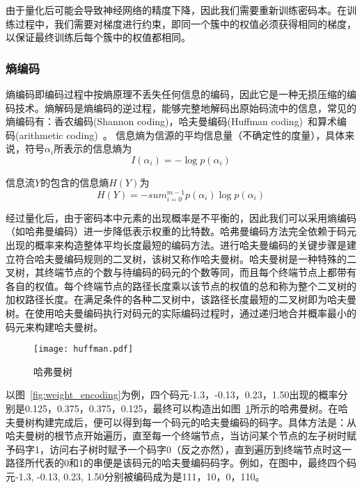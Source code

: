 由于量化后可能会导致神经网络的精度下降，因此我们需要重新训练密码本。在训练过程中，我们需要对梯度进行约束，即同一个簇中的权值必须获得相同的梯度，以保证最终训练后每个簇中的权值都相同。

\subsubsection{熵编码}


熵编码即编码过程中按熵原理不丢失任何信息的编码，因此它是一种无损压缩的编码技术。熵解码是熵编码的逆过程，能够完整地解码出原始码流中的信息，常见的熵编码有：香农编码(Shannon coding)，哈夫曼编码(Huffman coding)~\cite{huffman1952method}和算术编码(arithmetic coding)~\cite{witten1987arithmetic}。
信息熵为信源的平均信息量（不确定性的度量），具体来说，符号$\alpha_i$所表示的信息熵为
\begin{equation}
I(\alpha _i) = -\log p(\alpha _i)
\end{equation}

信息流$Y$的包含的信息熵$H(Y)$为
\begin{equation}
H(Y) = -sum_{i=0}^{m-1} p(\alpha _i) \log p(\alpha _i)
\end{equation}

经过量化后，由于密码本中元素的出现概率是不平衡的，因此我们可以采用熵编码（如哈弗曼编码）进一步降低表示权重的比特数。哈弗曼编码方法完全依赖于码元出现的概率来构造整体平均长度最短的编码方法。进行哈夫曼编码的关键步骤是建立符合哈夫曼编码规则的二叉树，该树又称作哈夫曼树。哈夫曼树是一种特殊的二叉树，其终端节点的个数与待编码的码元的个数等同，而且每个终端节点上都带有各自的权值。每个终端节点的路径长度乘以该节点的权值的总和称为整个二叉树的加权路径长度。在满足条件的各种二叉树中，该路径长度最短的二叉树即为哈夫曼树。在使用哈夫曼编码执行对码元的实际编码过程时，通过递归地合并概率最小的码元来构建哈夫曼树。

\begin{figure}[h]
\centering
\texttt{[image: huffman.pdf]}
\caption{哈弗曼树}
\label{fig:huffman}
\end{figure}
以图~\ref{fig:weight_encoding}为例，四个码元-1.3，-0.13，0.23，1.50出现的概率分别是0.125，0.375，0.375，0.125，最终可以构造出如图~\ref{fig:huffman}所示的哈弗曼树。在哈夫曼树构建完成后，便可以得到每一个码元的哈夫曼编码的码字。具体方法是：从哈夫曼树的根节点开始遍历，直至每一个终端节点，当访问某个节点的左子树时赋予码字1，访问右子树时赋予一个码字0（反之亦然），直到遍历到终端节点时这一路径所代表的0和1的串便是该码元的哈夫曼编码码字。例如，在图中，最终四个码元-1.3, -0.13, 0.23, 1.50分别被编码成为是111，10，0，110。

